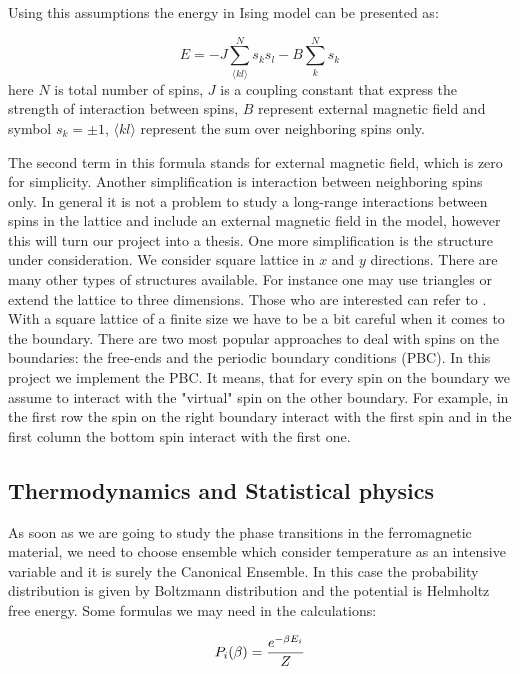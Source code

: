 \documentclass[a4paper]{article}
\begin{document}
Using this assumptions the energy in Ising model can be presented as:

\begin{equation}
E=-J\sum_{\langle kl\rangle }^{N}s_{k}s_{l} -B\sum_{k}^{N}s_{k} 
\end{equation}
here $N$ is total number of spins, $J$ is a coupling constant that express the
strength of interaction between spins, $B$ represent external magnetic field and symbol $s_{k}=\pm 1$, $\langle kl\rangle $ represent the sum over neighboring spins only.

The second term in this formula stands for external magnetic field, which is zero for simplicity. Another simplification is interaction between neighboring spins only. In general it is not a problem to study a long-range interactions between spins in the lattice and include an external magnetic field in the model, however this will turn our project into a thesis. One more simplification is the structure under consideration. We consider square lattice in $x$ and $y$ directions. There are many other types of structures available. For instance one may use triangles or extend the lattice to three dimensions. Those who are interested can refer to \cite{one}. \\
With a square lattice of a finite size we have to be a bit careful when it comes to the boundary. There are two most popular approaches to deal with spins on the boundaries: the free-ends and the periodic boundary conditions (PBC). In this project we implement the PBC. It means, that for every spin on the boundary we assume to interact with the "virtual" spin on the other boundary. For example, in the first row the spin on the right boundary interact with the first spin and in the first column the bottom spin interact with the first one. 

\subsection{Thermodynamics and Statistical physics}
As soon as we are going to study the phase transitions in the ferromagnetic material, we need to choose ensemble which consider temperature as an intensive variable and it is surely the Canonical Ensemble. In this case the probability distribution is given by Boltzmann distribution and the potential is Helmholtz free energy. Some formulas we may need in the calculations:

\begin{equation}
P_{i}(\beta) =\frac{e^{-\beta E_{i}}}{Z} \\
\end{equation}
\end{document}
